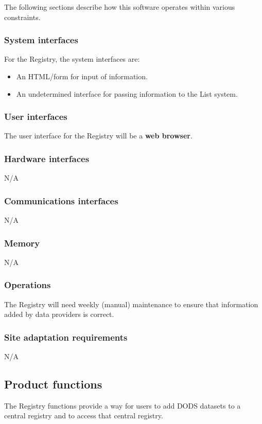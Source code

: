 \documentclass{article}
\begin{document}
The following sections describe how this software operates within various
constraints.

\subsubsection{System interfaces}
For the Registry, the system interfaces are:
\begin{itemize}
\item An HTML/form for input of information.
\item An undetermined interface for passing information to the List system.
\end{itemize}

\subsubsection{User interfaces}
The user interface for the Registry will be a \textbf{web browser}.

\subsubsection{Hardware interfaces}
N/A

\subsubsection{Communications interfaces}
N/A

\subsubsection{Memory}
N/A

\subsubsection{Operations}
The Registry will need weekly (manual) maintenance to ensure that information
added by data providers is correct. 

\subsubsection{Site adaptation requirements}
N/A

\subsection{Product functions}
The  Registry functions provide a way for users to add \acs{DODS}
datasets to a central registry and to access that central registry.
\end{document}
